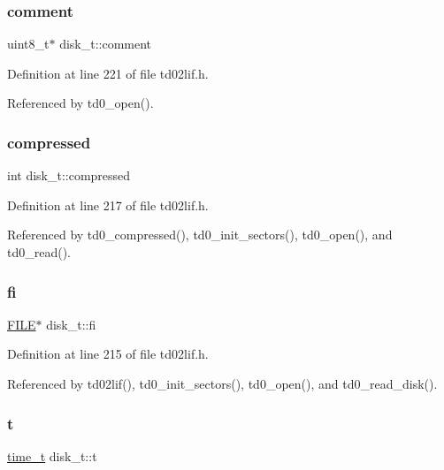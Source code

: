 \subsubsection{\texorpdfstring{comment}{comment}}
{\footnotesize\ttfamily uint8\+\_\+t$\ast$ disk\+\_\+t\+::comment}



Definition at line 221 of file td02lif.\+h.



Referenced by td0\+\_\+open().

\mbox{\label{structdisk__t_abe333f1a8b322fbed0d1c1178939016e}} 
\subsubsection{\texorpdfstring{compressed}{compressed}}
{\footnotesize\ttfamily int disk\+\_\+t\+::compressed}



Definition at line 217 of file td02lif.\+h.



Referenced by td0\+\_\+compressed(), td0\+\_\+init\+\_\+sectors(), td0\+\_\+open(), and td0\+\_\+read().

\mbox{\label{structdisk__t_a1832d0f8cdda8f731de9e1daea2900a5}} 
\subsubsection{\texorpdfstring{fi}{fi}}
{\footnotesize\ttfamily \hyperlink{posix_8h_aed4dabeb9f7c518ded42f930a04abce8}{F\+I\+LE}$\ast$ disk\+\_\+t\+::fi}



Definition at line 215 of file td02lif.\+h.



Referenced by td02lif(), td0\+\_\+init\+\_\+sectors(), td0\+\_\+open(), and td0\+\_\+read\+\_\+disk().

\mbox{\label{structdisk__t_a6cb7e0306f35b8b97bf3ef18e2f45455}} 
\subsubsection{\texorpdfstring{t}{t}}
{\footnotesize\ttfamily \hyperlink{time_8h_a3346b04b0420b32ccf6b706551b70762}{time\+\_\+t} disk\+\_\+t\+::t}



